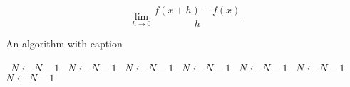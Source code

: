 \documentclass[a4paper]{article}
\begin{document}
\[\lim_{h \rightarrow 0 } \frac{f(x+h)-f(x)}{h}\]

\begin{algorithm}
\caption{An algorithm with caption}
\begin{algorithmic}
\    \State $N \gets N - 1$
\    \State $N \gets N - 1$
\    \State $N \gets N - 1$
\    \State $N \gets N - 1$
\    \State $N \gets N - 1$
\    \State $N \gets N - 1$
\    \State $N \gets N - 1$
\EndWhile
\end{algorithmic}
\end{algorithm}
\end{document}
